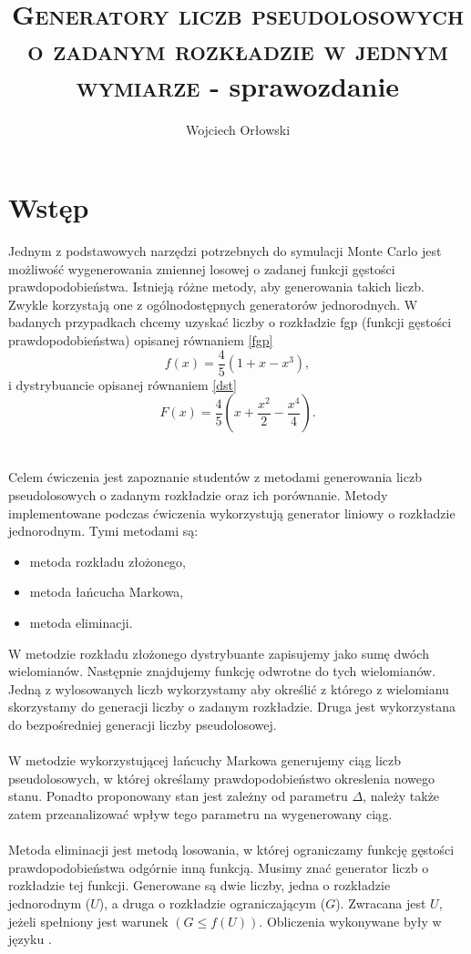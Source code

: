 \documentclass[a4paper,12pt]{article}
\author{Wojciech Orłowski}
\title{\textsc{Generatory liczb pseudolosowych o zadanym rozkładzie w jednym
wymiarze} - sprawozdanie}
\begin{document}
    \maketitle

    \section{Wstęp}

    Jednym z podstawowych narzędzi potrzebnych do symulacji Monte Carlo jest możliwość wygenerowania zmiennej losowej o zadanej funkcji gęstości prawdopodobieństwa.
    Istnieją różne metody, aby generowania takich liczb.
    Zwykle korzystają one z ogólnodostępnych generatorów jednorodnych.
    W badanych przypadkach chcemy uzyskać liczby o rozkładzie fgp (funkcji gęstości prawdopodobieństwa) opisanej równaniem \eqref{fgp}
    \begin{equation}
        f(x) = \frac{4}{5}(1 + x - x^3),
        \label{fgp}
    \end{equation}
    i dystrybuancie opisanej równaniem \eqref{dst}
    \begin{equation}
        F(x) = \frac{4}{5}\left(x + \frac{x^2}{2} - \frac{x^4}{4}\right).
        \label{dst}
    \end{equation}
    \\
    \\
    Celem ćwiczenia jest zapoznanie studentów z metodami generowania liczb pseudolosowych o zadanym rozkładzie oraz ich porównanie.
    Metody implementowane podczas ćwiczenia wykorzystują generator liniowy o rozkładzie jednorodnym. 
    Tymi metodami są:
    \begin{itemize}
        \item metoda rozkładu złożonego,
        \item metoda łańcucha Markowa,
        \item metoda eliminacji.
    \end{itemize}
    W metodzie rozkładu złożonego dystrybuante zapisujemy jako sumę dwóch wielomianów.
    Następnie znajdujemy funkcję odwrotne do tych wielomianów.
    Jedną z wylosowanych liczb wykorzystamy aby określić z którego z wielomianu skorzystamy do generacji liczby o zadanym rozkładzie.
    Druga jest wykorzystana do bezpośredniej generacji liczby pseudolosowej.
    \\
    \\
    W metodzie wykorzystującej łańcuchy Markowa generujemy ciąg liczb pseudolosowych, w której określamy prawdopodobieństwo okreslenia nowego stanu.
    Ponadto proponowany stan jest zależny od parametru $\Delta$, należy także zatem przeanalizować wpływ tego parametru na wygenerowany ciąg.
    \\
    \\
    Metoda eliminacji jest metodą losowania, w której ograniczamy funkcję gęstości prawdopodobieństwa odgórnie inną funkcją.
    Musimy znać generator liczb o rozkładzie tej funkcji.
    Generowane są dwie liczby, jedna o rozkładzie jednorodnym ($U$), a druga o rozkładzie ograniczającym ($G$).
    Zwracana jest $U$, jeżeli spełniony jest warunek $(G \leq f(U))$.
    Obliczenia wykonywane były w języku \julia.
\end{document}
